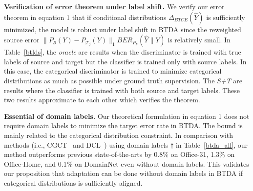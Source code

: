 \documentclass[letterpaper]{article} \usepackage{aaai23}  \usepackage{times}  \usepackage{helvet}  \usepackage{courier}  \usepackage[hyphens]{url}  \usepackage{graphicx} \urlstyle{rm} \def\UrlFont{\rm}  \usepackage{natbib}  \usepackage{caption} \frenchspacing  \setlength{\pdfpagewidth}{8.5in}  \setlength{\pdfpageheight}{11in}
\begin{document}
\noindent\textbf{Verification of error theorem under label shift.} We verify our error theorem in equation 1 that if conditional distributions $\Delta_{BTCE}(\hat{Y})$ is sufficiently minimized, the model is robust under label shift in BTDA since the reweighted source error $\| P_{\mathcal{S}}(Y) - P_{\mathcal{T}_j}(Y) \|_1  BER_{P_{\mathcal{S}}}(\hat{Y}\|Y)$ is relatively small. In Table~\ref{btlds}, the \textit{oracle} are results when the discriminator is trained with true labels of source and target but the classifier is trained only with source labels. In this case, the categorical discriminator is trained to minimize categorical distributions as much as possible under ground truth supervision. The \textit{S+T} are results where the classifier is trained with both source and target labels. These two results approximate to each other which verifies the theorem.



\begin{table}[!htbp]
\centering
{}
\caption{Accuracy ($\%$) of different uncertainty thresholds for \textit{Art} in Office-Home and \textit{Clipart} in Office-Home-LMT for BTDA (ResNet-50).}

\label{thre}
\end{table}





\noindent\textbf{Essential of domain labels.} Our theoretical formulation in equation 1 does not require domain labels to minimize the target error rate in BTDA. The bound is mainly related to the categorical distribution constraint. 
In comparison with methods (i.e., CGCT~\cite{roy2021curriculum} and DCL~\cite{nguyen2021unsupervised}) using domain labels $\dag$ in Table~\ref{btda_all}, our method outperforms previous state-of-the-arts by 0.8\% on Office-31, 1.3\% on Office-Home, and 0.1\% on DomainNet even without domain labels.
This validates our proposition that adaptation can be done without domain labels in BTDA if categorical distributions is sufficiently aligned.
\end{document}
